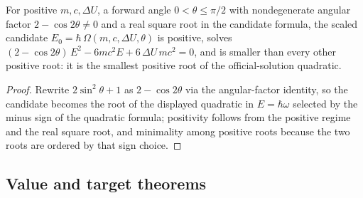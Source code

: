 \begin{lemma}
\label{lem:IPhO2026Problems_problem_IPhO_2026_1_C_1:quadratic_characterization_of_threshold}
For positive $m, c, \Delta U$, a forward angle $0 < \theta \le \pi/2$ with
nondegenerate angular factor $2 - \cos 2\theta \neq 0$ and a real square
root in the candidate formula, the scaled candidate
$E_0 = \hbar\,\Omega(m,c,\Delta U,\theta)$ is positive, solves
$(2 - \cos 2\theta)\,E^2 - 6 m c^2 E + 6\,\Delta U\,m c^2 = 0$,
and is smaller than every other positive root: it is the smallest positive
root of the official-solution quadratic.
\end{lemma}
\begin{proof}
Rewrite $2\sin^2\theta + 1$ as $2 - \cos 2\theta$ via the angular-factor
identity, so the candidate becomes the root of the displayed quadratic in
$E = \hbar\omega$ selected by the minus sign of the quadratic formula;
positivity follows from the positive regime and the real square root, and
minimality among positive roots because the two roots are ordered by that
sign choice.
\end{proof}

\subsection*{Value and target theorems}

